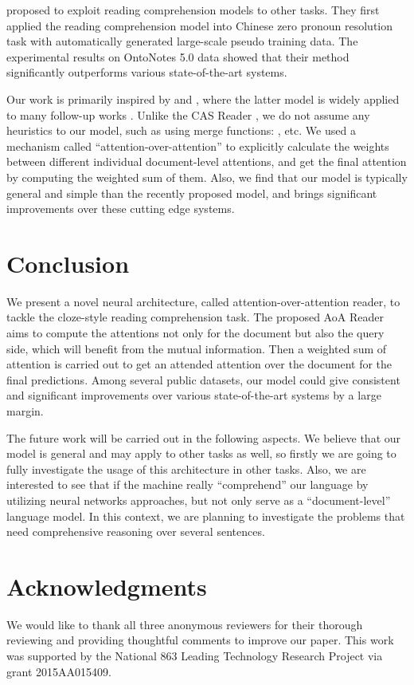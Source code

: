 \documentclass[11pt,a4paper]{article}
\begin{document}
\citet{liu-etal-2016} proposed to exploit reading comprehension models to other tasks. They first applied the reading comprehension model into Chinese zero pronoun resolution task with automatically generated large-scale pseudo training data. The experimental results on OntoNotes 5.0 data showed that their method significantly outperforms various state-of-the-art systems.

Our work is primarily inspired by  and  , where the latter model is widely applied to many follow-up works \cite{sordoni-etal-2016,trischler-etal-2016,cui-etal-2016}. Unlike the CAS Reader \cite{cui-etal-2016}, we do not assume any heuristics to our model, such as using merge functions: ,  etc. We used a mechanism called ``attention-over-attention'' to explicitly calculate the weights between different individual document-level attentions, and get the final attention by computing the weighted sum of them. Also, we find that our model is typically general and simple than the recently proposed model, and brings significant improvements over these cutting edge systems.


\section{Conclusion}\label{conclusion}

We present a novel neural architecture, called attention-over-attention reader, to tackle the cloze-style reading comprehension task. 
The proposed AoA Reader aims to compute the attentions not only for the document but also the query side, which will benefit from the mutual information. 
Then a weighted sum of attention is carried out to get an attended attention over the document for the final predictions. 
Among several public datasets, our model could give consistent and significant improvements over various state-of-the-art systems by a large margin. 

The future work will be carried out in the following aspects. 
We believe that our model is general and may apply to other tasks as well, so firstly we are going to fully investigate the usage of this architecture in other tasks. 
Also, we are interested to see that if the machine really ``comprehend'' our language by utilizing neural networks approaches, but not only serve as a ``document-level'' language model. In this context, we are planning to investigate the problems that need comprehensive reasoning over several sentences.

\section*{Acknowledgments}
We would like to thank all three anonymous reviewers for their thorough reviewing and providing thoughtful comments to improve our paper. This work was supported by the National 863 Leading Technology Research Project via grant 2015AA015409. 



\end{document}

